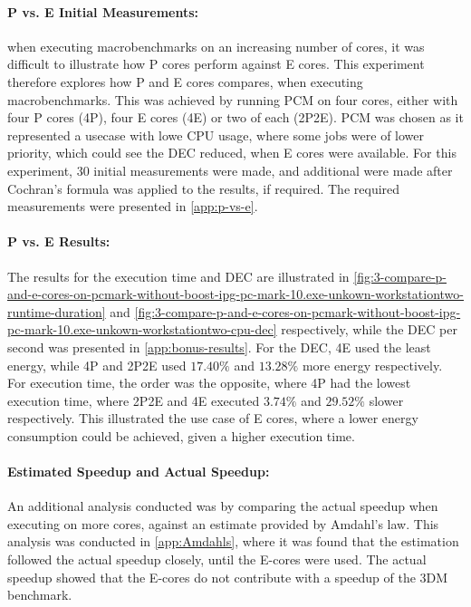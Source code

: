 

\paragraph{P vs. E Initial Measurements:} when executing macrobenchmarks on an increasing number of cores, it was difficult to illustrate how P cores perform against E cores. This experiment therefore explores how P and E cores compares, when executing macrobenchmarks. This was achieved by running PCM on four cores, either with four P cores (4P), four E cores (4E) or two of each (2P2E). PCM was chosen as it represented a usecase with lowe CPU usage, where some jobs were of lower priority, which could see the DEC reduced, when E cores were available. For this experiment, $30$ initial measurements were made, and additional were made after Cochran's formula was applied to the results, if required. The required measurements were presented in \cref{app:p-vs-e}.



\paragraph{P vs. E Results:} The results for the execution time and DEC are illustrated in \cref{fig:3-compare-p-and-e-cores-on-pcmark-without-boost-ipg-pc-mark-10.exe-unkown-workstationtwo-runtime-duration} and  \cref{fig:3-compare-p-and-e-cores-on-pcmark-without-boost-ipg-pc-mark-10.exe-unkown-workstationtwo-cpu-dec} respectively, while the DEC per second was presented in \cref{app:bonus-results}. For the DEC, 4E used the least energy, while 4P and 2P2E used $17.40\%$ and $13.28\%$ more energy respectively. For execution time, the order was the opposite, where 4P had the lowest execution time, where 2P2E and 4E executed $3.74\%$ and $29.52\%$ slower respectively. This illustrated the use case of E cores, where a lower energy consumption could be achieved, given a higher execution time.  


\paragraph{Estimated Speedup and Actual Speedup:}
An additional analysis conducted was by comparing the actual speedup when executing on more cores, against an estimate provided by Amdahl's law. This analysis was conducted in \cref{app:Amdahls}, where it was found that the estimation followed the actual speedup closely, until the E-cores were used. The actual speedup showed that the E-cores do not contribute with a speedup of the 3DM benchmark.


